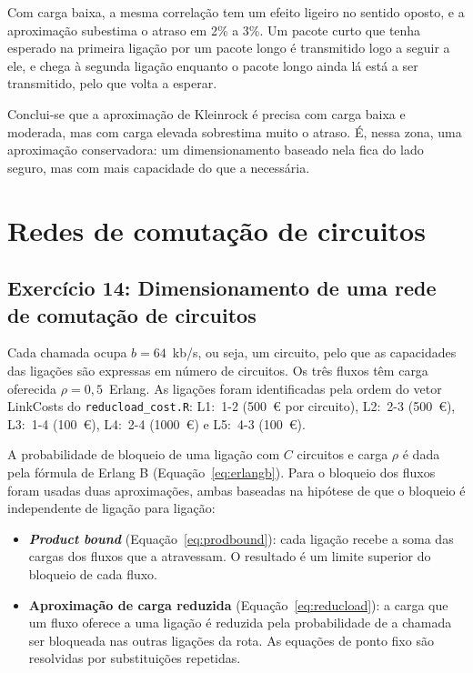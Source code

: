 \documentclass[10pt,a4paper]{article}
\begin{document}
Com carga baixa, a mesma correlação tem um efeito ligeiro no sentido oposto, e a aproximação subestima o atraso em 2\% a 3\%. Um pacote curto que tenha esperado na primeira ligação por um pacote longo é transmitido logo a seguir a ele, e chega à segunda ligação enquanto o pacote longo ainda lá está a ser transmitido, pelo que volta a esperar.

Conclui-se que a aproximação de Kleinrock é precisa com carga baixa e moderada, mas com carga elevada sobrestima muito o atraso. É, nessa zona, uma aproximação conservadora: um dimensionamento baseado nela fica do lado seguro, mas com mais capacidade do que a necessária.


\newpage

\section{Redes de comutação de circuitos}

\subsection{Exercício 14: Dimensionamento de uma rede de comutação de circuitos}

Cada chamada ocupa $b=64$~kb/s, ou seja, um circuito, pelo que as capacidades das ligações são expressas em número de circuitos. Os três fluxos têm carga oferecida $\rho=0{,}5$~Erlang. As ligações foram identificadas pela ordem do vetor LinkCosts do \texttt{reducload\_cost.R}: L1:~1-2 (500~€ por circuito), L2:~2-3 (500~€), L3:~1-4 (100~€), L4:~2-4 (1000~€) e L5:~4-3 (100~€).

A probabilidade de bloqueio de uma ligação com $C$ circuitos e carga $\rho$ é dada pela fórmula de Erlang B (Equação~\ref{eq:erlangb}). Para o bloqueio dos fluxos foram usadas duas aproximações, ambas baseadas na hipótese de que o bloqueio é independente de ligação para ligação:
\begin{itemize}
  \item \textbf{\textit{Product bound}} (Equação~\ref{eq:prodbound}): cada ligação recebe a soma das cargas dos fluxos que a atravessam. O resultado é um limite superior do bloqueio de cada fluxo.
  \item \textbf{Aproximação de carga reduzida} (Equação~\ref{eq:reducload}): a carga que um fluxo oferece a uma ligação é reduzida pela probabilidade de a chamada ser bloqueada nas outras ligações da rota. As equações de ponto fixo são resolvidas por substituições repetidas.
\end{itemize}
\end{document}
